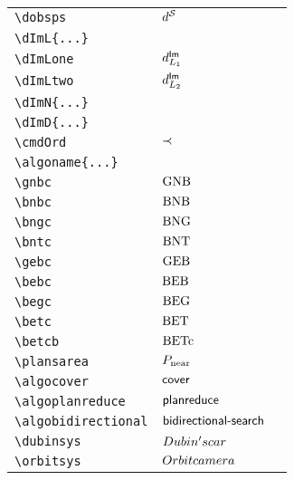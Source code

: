 \begin{longtable}{lll}
 {\color[rgb]{0.5,0.5,0.5}\texttt{\textbackslash dobsps}} & $\dobsps$ & \\ 
 {\color[rgb]{0.5,0.5,0.5}\texttt{\textbackslash dImL\{...\}}} &  & \\ 
 {\color[rgb]{0.5,0.5,0.5}\texttt{\textbackslash dImLone}} & $d^{\mathsf{Im}}_{L_{1}}$ & \\ 
 {\color[rgb]{0.5,0.5,0.5}\texttt{\textbackslash dImLtwo}} & $d^{\mathsf{Im}}_{L_{2}}$ & \\ 
 {\color[rgb]{0.5,0.5,0.5}\texttt{\textbackslash dImN\{...\}}} &  & \\ 
 {\color[rgb]{0.5,0.5,0.5}\texttt{\textbackslash dImD\{...\}}} &  & \\ 
 {\color[rgb]{0.5,0.5,0.5}\texttt{\textbackslash cmdOrd}} & $\prec$ & \\ 
 {\color[rgb]{0.5,0.5,0.5}\texttt{\textbackslash algoname\{...\}}} &  & \\ 
 {\color[rgb]{0.5,0.5,0.5}\texttt{\textbackslash gnbc}} & $\text{GNB}$ & \\ 
 {\color[rgb]{0.5,0.5,0.5}\texttt{\textbackslash bnbc}} & $\text{BNB}$ & \\ 
 {\color[rgb]{0.5,0.5,0.5}\texttt{\textbackslash bngc}} & $\text{BNG}$ & \\ 
 {\color[rgb]{0.5,0.5,0.5}\texttt{\textbackslash bntc}} & $\text{BNT}$ & \\ 
 {\color[rgb]{0.5,0.5,0.5}\texttt{\textbackslash gebc}} & $\text{GEB}$ & \\ 
 {\color[rgb]{0.5,0.5,0.5}\texttt{\textbackslash bebc}} & $\text{BEB}$ & \\ 
 {\color[rgb]{0.5,0.5,0.5}\texttt{\textbackslash begc}} & $\text{BEG}$ & \\ 
 {\color[rgb]{0.5,0.5,0.5}\texttt{\textbackslash betc}} & $\text{BET}$ & \\ 
 {\color[rgb]{0.5,0.5,0.5}\texttt{\textbackslash betcb}} & $\text{BETc}$ & \\ 
 {\color[rgb]{0.5,0.5,0.5}\texttt{\textbackslash plansarea}} & $P_{\text{near}}$ & \\ 
 {\color[rgb]{0.5,0.5,0.5}\texttt{\textbackslash algocover}} & $\textsf{cover}$ & \\ 
 {\color[rgb]{0.5,0.5,0.5}\texttt{\textbackslash algoplanreduce}} & $\textsf{planreduce}$ & \\ 
 {\color[rgb]{0.5,0.5,0.5}\texttt{\textbackslash algobidirectional}} & $\textsf{bidirectional-search}$ & \\ 
 {\color[rgb]{0.5,0.5,0.5}\texttt{\textbackslash dubinsys}} & $Dubin's car$ & \\ 
 {\color[rgb]{0.5,0.5,0.5}\texttt{\textbackslash orbitsys}} & $Orbit camera$ & \\ 

\end{longtable}
